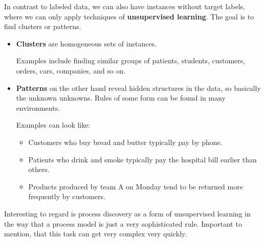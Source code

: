 In contrast to labeled data, we can also have instances without target labels, where we can only apply techniques of \textbf{unsupervised learning}. The goal is to find clusters or patterns.
\begin{itemize}
  \item \textbf{Clusters} are homogeneous sets of instances. \begin{note}Examples include finding similar groups of patients, students, customers, orders, cars, companies, and so on.\end{note}
  \item \textbf{Patterns} on the other hand reveal hidden structures in the data, so basically the unknown unknowns. Rules of some form can be found in many environments. \begin{note}Examples can look like:
  \begin{itemize}
    \item Customers who buy bread and butter typically pay by phone.
    \item Patients who drink and smoke typically pay the hospital bill earlier than others.
    \item Products produced by team A on Monday tend to be returned more frequently by customers.
  \end{itemize}\end{note}
\end{itemize}

Interesting to regard is process discovery as a form of unsupervised learning in the way that a process model is just a very sophisticated rule. Important to mention, that this task can get very complex very quickly.
